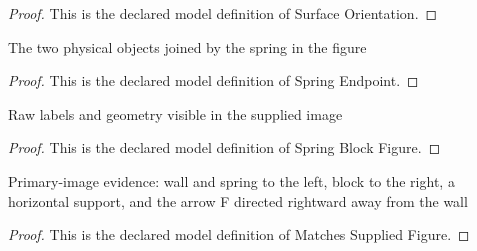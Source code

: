 \begin{proof}
  This is the declared model definition of Surface Orientation.
\end{proof}
\begin{definition}
  \label{def:physics:phyx-mini-0226:phyxminiproblems-problemphyxmini0226-springendpoint}
  The two physical objects joined by the spring in the figure
\end{definition}
\begin{proof}
  This is the declared model definition of Spring Endpoint.
\end{proof}
\begin{definition}
  \label{def:physics:phyx-mini-0226:phyxminiproblems-problemphyxmini0226-springblockfigure}
  Raw labels and geometry visible in the supplied image
\end{definition}
\begin{proof}
  This is the declared model definition of Spring Block Figure.
\end{proof}
\begin{definition}
  \label{def:physics:phyx-mini-0226:phyxminiproblems-problemphyxmini0226-matchessuppliedfigure}
  Primary-image evidence: wall and spring to the left, block to the right, a horizontal support, and the arrow F directed rightward away from the wall
\end{definition}
\begin{proof}
  This is the declared model definition of Matches Supplied Figure.
\end{proof}
